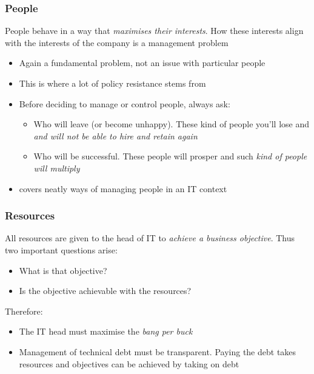 \begin{frame}[fragile]
  \frametitle{People}
  People behave in a way that \emph{maximises their interests}. How these interests align with the interests of the company is a management problem
	\begin{itemize}
		\item Again a fundamental problem, not an issue with particular people
		\item This is where a lot of policy resistance stems from 
		\item Before deciding to manage or control people, always ask:
			\begin{itemize}
				\item Who will leave (or become unhappy). These kind of people you'll lose and \emph{and will not be able to hire and retain again}
				\item Who will be successful. These people will prosper and such \emph{kind of people will multiply}
			\end{itemize}
		\item \cite{spolsky2008more} covers neatly ways of managing people in an IT context
	\end{itemize}
\end{frame}

\begin{frame}[fragile]
  \frametitle{Resources}
  	All resources are given to the head of IT to \emph{achieve a business objective}. Thus two important questions arise:
	\begin{itemize}
		\item What is that objective?
		\item Is the objective achievable with the resources?
	\end{itemize}

	Therefore:
	\begin{itemize}
		\item The IT head must maximise the \emph{bang per buck} 
		\item Management of technical debt must be transparent. Paying the debt takes resources and objectives can be achieved by taking on debt
	\end{itemize}
\end{frame}


